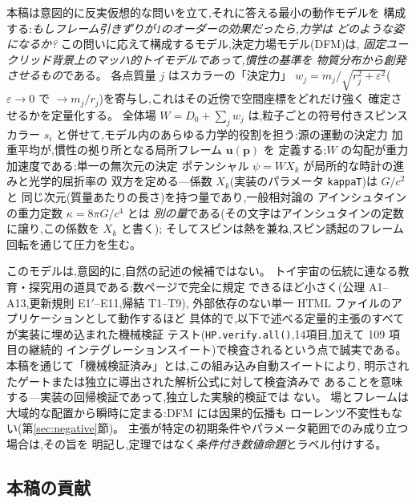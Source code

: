 \documentclass[a4paper,10pt,twocolumn]{ltjsarticle}
\newcommand{\vect}[1]{\bm{#1}}
\newcommand{\Kt}{X_k}
\newcommand{\Dz}{D_0}
\begin{document}
本稿は意図的に反実仮想的な問いを立て,それに答える最小の動作モデルを
構成する:\emph{もしフレーム引きずりが1のオーダーの効果だったら,力学は
どのような姿になるか?}
この問いに応えて構成するモデル,決定力場モデル(DFM)は,
\emph{固定ユークリッド背景上のマッハ的トイモデルであって,慣性の基準を
物質分布から創発させるもの}である。
各点質量 $j$ はスカラーの「決定力」
$w_j = m_j/\sqrt{r_j^2+\varepsilon^2}$($\varepsilon \to 0$ で
$\to m_j/r_j$)を寄与し,これはその近傍で空間座標をどれだけ強く
確定させるかを定量化する。
全体場 $W = \Dz + \sum_j w_j$ は,粒子ごとの符号付きスピンスカラー
$s_i$ と併せて,モデル内のあらゆる力学的役割を担う:源の運動の決定力
加重平均が,慣性の拠り所となる局所フレーム $\vect{u}(\vect{p})$ を
定義する;$W$ の勾配が重力加速度である;単一の無次元の決定
ポテンシャル $\psi = W\Kt$ が局所的な時計の進みと光学的屈折率の
双方を定める---係数 $\Kt$(実装のパラメータ \texttt{kappaT})は $G/c^2$ と
同じ次元(質量あたりの長さ)を持つ量であり,一般相対論の
アインシュタインの重力定数 $\kappa = 8\pi G/c^4$ とは
\emph{別の量}である(その文字はアインシュタインの定数に譲り,この係数を $\Kt$ と書く);
そしてスピンは熱を兼ね,スピン誘起のフレーム回転を通じて圧力を生む。

このモデルは,意図的に,自然の記述の候補ではない。
トイ宇宙の伝統に連なる教育・探究用の道具である:数ページで完全に規定
できるほど小さく(公理 A1--A13,更新規則 E1$'$--E11,帰結 T1--T9),
外部依存のない単一 HTML ファイルのアプリケーションとして動作するほど
具体的で,以下で述べる定量的主張のすべてが実装に埋め込まれた機械検証
テスト(\texttt{HP.verify.all()},14項目,加えて 109 項目の継続的
インテグレーションスイート)で検査されるという点で誠実である。
本稿を通じて「機械検証済み」とは,この組み込み自動スイートにより,
明示されたゲートまたは独立に導出された解析公式に対して検査済みで
あることを意味する---実装の回帰検証であって,独立した実験的検証では
ない。
場とフレームは大域的な配置から瞬時に定まる:DFM には因果的伝播も
ローレンツ不変性もない(第\ref{sec:negative}節)。
主張が特定の初期条件やパラメータ範囲でのみ成り立つ場合は,その旨を
明記し,定理ではなく\emph{条件付き数値命題}とラベル付けする。

\subsection{本稿の貢献}
\label{sec:contributions}
\end{document}
